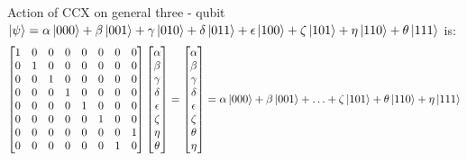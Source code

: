 Action of CCX on general three - qubit $\ket{\psi} = \alpha\ket{000}+\beta\ket{001}+\gamma\ket{010}+\delta\ket{011}+\epsilon\ket{100}+\zeta\ket{101}+\eta\ket{110}+\theta\ket{111}$ is:
\[
    \begin{bmatrix} 
        1 & 0 & 0 & 0 & 0 & 0 & 0 & 0 \\
        0 & 1 & 0 & 0 & 0 & 0 & 0 & 0 \\
        0 & 0 & 1 & 0 & 0 & 0 & 0 & 0 \\
        0 & 0 & 0 & 1 & 0 & 0 & 0 & 0 \\
        0 & 0 & 0 & 0 & 1 & 0 & 0 & 0 \\
        0 & 0 & 0 & 0 & 0 & 1 & 0 & 0 \\
        0 & 0 & 0 & 0 & 0 & 0 & 0 & 1 \\
        0 & 0 & 0 & 0 & 0 & 0 & 1 & 0
    \end{bmatrix}\begin{bmatrix}
        \alpha \\
        \beta \\
        \gamma \\
        \delta \\
        \epsilon \\
        \zeta \\
        \eta \\
        \theta
    \end{bmatrix}=\begin{bmatrix}
        \alpha \\
        \beta \\
        \gamma \\
        \delta \\
        \epsilon \\
        \zeta \\
        \theta \\
        \eta
    \end{bmatrix}=\alpha\ket{000}+\beta\ket{001}+\ldots+\zeta\ket{101}+\theta\ket{110}+\eta\ket{111}
\]

